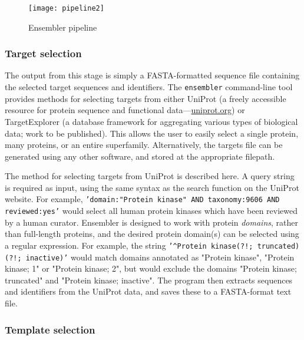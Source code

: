 \documentclass[aps,pre,twocolumn,nofootinbib,superscriptaddress,linenumbers]{revtex4-1}
\begin{document}
\begin{figure*}[h]
  \centering
    \texttt{[image: pipeline2]}
  \caption{Ensembler pipeline}
  \label{figpipeline}
\end{figure*}

\subsubsection{Target selection}

The output from this stage is simply a FASTA-formatted sequence file containing the selected target sequences and identifiers. 
The {\tt ensembler} command-line tool provides methods for selecting targets from either UniProt (a freely accessible resource for protein sequence and functional data---\href{http://www.uniprot.org/}{uniprot.org}) or TargetExplorer (a database framework for aggregating various types of biological data; work to be published). 
This allows the user to easily select a single protein, many proteins, or an entire superfamily. Alternatively, the targets file can be generated using any other software, and stored at the appropriate filepath.

The method for selecting targets from UniProt is described here. 
A query string is required as input, using the same syntax as the search function on the UniProt website. 
For example, {\tt'domain:"Protein kinase" AND taxonomy:9606 AND reviewed:yes'} would select all human protein kinases which have been reviewed by a human curator. 
Ensembler is designed to work with protein \emph{domains}, rather than full-length proteins, and the desired protein domain(s) can be selected using a regular expression. 
For example, the string {\tt'\^{}Protein kinase(?!; truncated)(?!; inactive)'} would match domains annotated as "Protein kinase", "Protein kinase; 1" or "Protein kinase; 2", but would exclude the domains "Protein kinase; truncated" and "Protein kinase; inactive". 
The program then extracts sequences and identifiers from the UniProt data, and saves these to a FASTA-format text file.


\subsubsection{Template selection}
\end{document}
